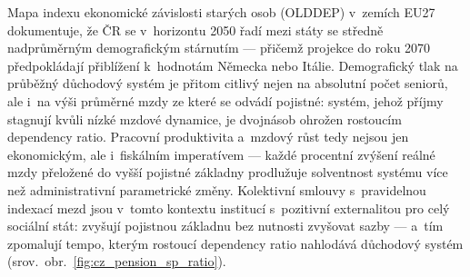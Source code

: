 Mapa indexu ekonomické závislosti starých osob (OLDDEP) v~zemích EU27 dokumentuje, že ČR se v~horizontu 2050 řadí mezi státy se středně nadprůměrným demografickým stárnutím --- přičemž projekce do roku 2070 předpokládají přiblížení k~hodnotám Německa nebo Itálie.
Demografický tlak na průběžný důchodový systém je přitom citlivý nejen na absolutní počet seniorů, ale i~na výši průměrné mzdy ze které se odvádí pojistné: systém, jehož příjmy stagnují kvůli nízké mzdové dynamice, je dvojnásob ohrožen rostoucím dependency ratio.
Pracovní produktivita a~mzdový růst tedy nejsou jen ekonomickým, ale i~fiskálním imperatívem --- každé procentní zvýšení reálné mzdy přeložené do vyšší pojistné základny prodlužuje solventnost systému více než administrativní parametrické změny.
Kolektivní smlouvy s~pravidelnou indexací mezd jsou v~tomto kontextu institucí s~pozitivní externalitou pro celý sociální stát: zvyšují pojistnou základnu bez nutnosti zvyšovat sazby --- a~tím zpomalují tempo, kterým rostoucí dependency ratio nahlodává důchodový systém (srov.~obr.~\ref{fig:cz_pension_sp_ratio}).


